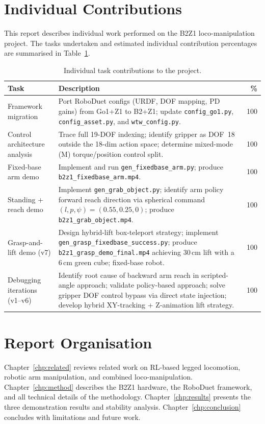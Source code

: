 \section{Individual Contributions}

This report describes individual work performed on the B2Z1
loco-manipulation project. The tasks undertaken and estimated individual
contribution percentages are summarised in Table~\ref{tab:contributions}.

\begin{table}[htbp]
  \centering
  \caption{Individual task contributions to the project.}
  \label{tab:contributions}
  \renewcommand{\arraystretch}{1.2}
  \begin{tabularx}{\textwidth}{lXr}
    \toprule
    \textbf{Task} & \textbf{Description} & \textbf{\%} \\
    \midrule
    Framework migration
      & Port RoboDuet configs (URDF, DOF mapping, PD gains) from Go1+Z1
        to B2+Z1; update \texttt{config\_go1.py}, \texttt{config\_asset.py},
        and \texttt{wtw\_config.py}.
      & 100 \\
    Control architecture analysis
      & Trace full 19-DOF indexing; identify gripper as DOF~18 outside the
        18-dim action space; determine mixed-mode (M) torque/position control
        split.
      & 100 \\
    Fixed-base arm demo
      & Implement and run \texttt{gen\_fixedbase\_arm.py}; produce
        \texttt{b2z1\_fixedbase\_arm.mp4}.
      & 100 \\
    Standing + reach demo
      & Implement \texttt{gen\_grab\_object.py}; identify arm policy forward
        reach direction via spherical command $(l,p,\psi)=(0.55,0.25,0)$;
        produce \texttt{b2z1\_grab\_object.mp4}.
      & 100 \\
    Grasp-and-lift demo (v7)
      & Design hybrid-lift box-teleport strategy; implement
        \texttt{gen\_grasp\_fixedbase\_success.py}; produce
        \texttt{b2z1\_grasp\_demo\_final.mp4} achieving 30\,cm lift
        with a 6\,cm green cube; fixed-base robot.
      & 100 \\
    Debugging iterations (v1--v6)
      & Identify root cause of backward arm reach in scripted-angle
        approach; validate policy-based approach; solve gripper DOF
        control bypass via direct state injection; develop hybrid
        XY-tracking + Z-animation lift strategy.
      & 100 \\
    \bottomrule
  \end{tabularx}
\end{table}

\section{Report Organisation}

Chapter~\ref{chp:related} reviews related work on RL-based legged
locomotion, robotic arm manipulation, and combined loco-manipulation.
Chapter~\ref{chp:method} describes the B2Z1 hardware, the RoboDuet
framework, and all technical details of the methodology.
Chapter~\ref{chp:results} presents the three demonstration results and
stability analysis.
Chapter~\ref{chp:conclusion} concludes with limitations and future work.
